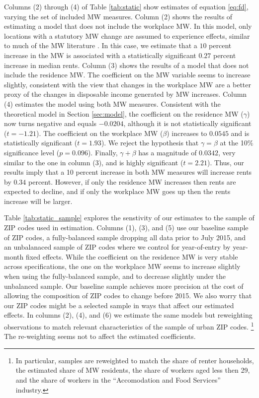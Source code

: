 Columns (2) through (4) of Table \ref{tab:static} show estimates of equation 
\eqref{eq:fd}, varying the set of included MW measures.
Column (2) shows the results of estimating a model that does not include the 
workplace MW.
In this model, only locations with a statutory MW change are assumed to 
experience effects, similar to much of the MW literature 
\parencite[e.g.,][]{DubeEtAl2010, MeerWest2016, Yamagishi2021}.
In this case, we estimate that a $10$ percent increase in the MW is associated 
with a statistically significant $0.27$ percent increase in median rents.
Column (3) shows the results of a model that does not include the residence MW.
The coefficient on the MW variable seems to increase slightly, consistent with 
the view that changes in the workplace MW are a better proxy of the changes in 
disposable income generated by MW increases.
Column (4) estimates the model using both MW measures.
Consistent with the theoretical model in Section \ref{sec:model}, the 
coefficient on the residence MW ($\gamma$) now turns negative and equals 
$-0.0204$, although it is not statistically significant ($t=-1.21$).
The coefficient on the workplace MW ($\beta$) increases to $0.0545$ and is 
statistically significant ($t=1.93$).
We reject the hypothesis that $\gamma=\beta$ at the 10\% significance level 
($p = 0.096$).
Finally, $\gamma+\beta$ has a magnitude of $0.0342$, very similar to the one 
in column (3), and is highly significant ($t=2.21$).
Thus, our results imply that a 10 percent increase in both MW measures will 
increase rents by $0.34$ percent.
However, if only the residence MW increases then rents are expected to decline,
and if only the workplace MW goes up then the rents increase will be larger.

Table \ref{tab:static_sample} explores the senstivity of our estimates to 
the sample of ZIP codes used in estimation.
Columns (1), (3), and (5) use our baseline sample of ZIP codes, 
a fully-balanced sample dropping all data prior to July 2015, and
an unbalanaced sample of ZIP codes where we control for year-of-entry by
year-month fixed effects.
While the coefficient on the residence MW is very stable across specifications,
the one on the workplace MW seems to increase slightly when using the fully-balanced
sample, and to decrease slightly under the unbalanced sample.
Our baseline sample achieves more precision at the cost of allowing the 
composition of ZIP codes to change before 2015.
We also worry that our ZIP codes might be a selected sample in ways that affect
our estimated effects.
In columns (2), (4), and (6) we estimate the same models but reweighting 
observations to match relevant characteristics of the sample of urban 
ZIP codes.%
\footnote{In particular, samples are reweighted to match the share of renter
households, the estimated share of MW residents, the share of workers aged
less then 29, and the share of workers in the ``Accomodation and Food Services''
industry.}
The re-weighting seems not to affect the estimated coefficients.

